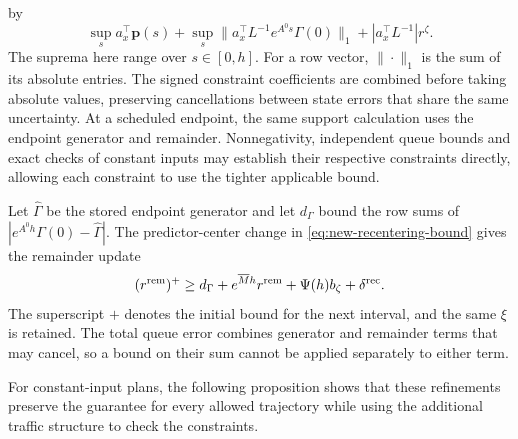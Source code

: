 \documentclass[final]{cas-sc}
\theoremstyle{definition}
\theoremstyle{plain}
\theoremstyle{definition}
\theoremstyle{plain}
\begin{document}
by
\begin{equation}
\sup_s a_x^\top\mathbf p(s)
+\sup_s\|a_x^\top L^{-1}e^{A^0s}\Gamma(0)\|_1
+|a_x^\top L^{-1}|r^{\zeta}.
\label{eq:structure-signed-output}
\end{equation}
The suprema here range over $s\in[0,h]$. For a row vector,
$\|\cdot\|_1$ is the sum of its absolute entries. The signed constraint
coefficients are combined before taking absolute values, preserving
cancellations between state errors that share the same uncertainty. At
a scheduled endpoint, the same support calculation uses the endpoint
generator and remainder. Nonnegativity, independent queue bounds and
exact checks of constant inputs may establish their respective
constraints directly, allowing each constraint to use the tighter
applicable bound.

Let $\widehat\Gamma$ be the stored endpoint generator and let
$d_\Gamma$ bound the row sums of $|e^{A^0h}\Gamma(0)-\widehat\Gamma|$.
The predictor-center change in \eqref{eq:new-recentering-bound} gives the
remainder update
\begin{equation}
(r^{\rm rem})^+\ge d_\Gamma+e^{\overline Mh}r^{\rm rem}
+\Psi(h)b_\zeta+\delta^{\rm rec}.
\label{eq:structure-endpoint-update}
\end{equation}
The superscript $+$ denotes the initial bound for the next interval,
and the same $\xi$ is retained. The total queue error combines
generator and remainder terms that may cancel, so a bound on their sum
cannot be applied separately to either term.

For constant-input plans, the following proposition shows that these
refinements preserve the guarantee for every allowed trajectory while
using the additional traffic structure to check the constraints.
\end{document}
